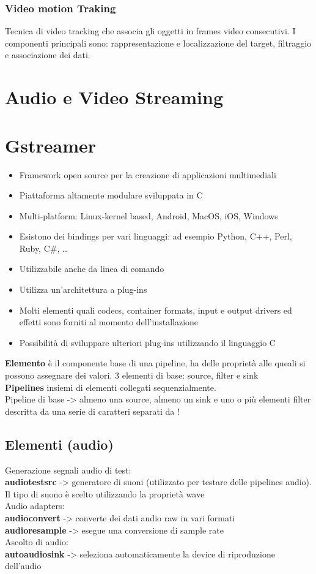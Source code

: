 \documentclass[8pt,a4paper]{article}
\begin{document}
\begin{multicols}{5}
    \subsubsection{Video motion Traking}
    Tecnica di video tracking che associa gli oggetti in frames video consecutivi. I 
    componenti principali sono: rappresentazione e localizzazione del target, 
    filtraggio e associazione dei dati.
    \section{Audio e Video Streaming}

    \section{Gstreamer}
    \begin{itemize}
     \item Framework open source per la creazione di applicazioni multimediali
     \item Piattaforma altamente modulare sviluppata in C
     \item Multi-platform: Linux-kernel based, Android, MacOS, iOS, Windows
     \item Esistono dei bindings per vari linguaggi: ad esempio Python, C++, Perl, Ruby, C#, …
     \item Utilizzabile anche da linea di comando
     \item Utilizza un’architettura a plug-ins
     \item Molti elementi quali codecs, container formats, input e output drivers ed effetti sono forniti al momento dell’installazione
     \item Possibilità di sviluppare ulteriori plug-ins utilizzando il linguaggio C
    \end{itemize}
    \textbf{Elemento} è il componente base di una pipeline, ha delle proprietà alle queali si possono assegnare dei valori.
    3 elementi di base: source, filter e sink \\
    \textbf{Pipelines} insiemi di elementi collegati sequenzialmente. \\
    Pipeline di base -> almeno una source, almeno un sink e uno o più elementi filter 
    descritta da una serie di caratteri separati da !
    \subsection{Elementi (audio)}
    Generazione segnali audio di test:\\
    \textbf{audiotestsrc} -> generatore di suoni (utilizzato per testare delle pipelines audio).
    Il tipo di suono è scelto utilizzando la proprietà wave\\
    \noindent
    Audio adapters:\\
    \textbf{audioconvert} -> converte dei dati audio raw in vari formati\\
    \textbf{audioresample} -> esegue una conversione di sample rate\\
    Ascolto di audio:\\
    \textbf{autoaudiosink} -> seleziona automaticamente la device di riproduzione dell’audio


\end{multicols}
\end{document}
